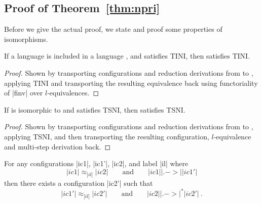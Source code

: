 \subsection{Proof of Theorem~\ref{thm:npri}}
\label{sec:proofs}

Before we give the actual proof, we state and proof some properties
of isomorphisms.

\begin{theorem}
  If a language  is included in a language , and 
  satisfies TINI, then  satisfies TINI.
\end{theorem}

\begin{proof}
  Shown by transporting configurations and reduction derivations
  from  to , applying TINI and transporting the resulting
  equivalence back using functoriality of |finv| over $l$-equivalences.
\end{proof}

\begin{theorem}
  If  is isomorphic to  and  satisfies TSNI, then
   satisfies TSNI.
\end{theorem}

\begin{proof}
  Shown by transporting configurations and reduction derivations from
   to , applying TSNI, and then transporting the
  resulting configuration, $l$-equivalence and multi-step derivation back.
\end{proof}


\begin{lemma}
  \label{lemma:tsni}
  For any configurations |ic1|, |ic1'|, |ic2|, and label |il| where
  \begin{equation} \label{eq:tsni-lemma-lhs}
  |ic1| \approx_{|il|} |ic2|
  \qquad \text{and} \qquad
  |ic1| |.->| |ic1'|
  \end{equation}
  then there exists a configuration |ic2'| such that
  \begin{equation} \label{eq:tsni-lemma-rhs}
  |ic1'| \approx_{|il|} |ic2'|
  \qquad \text{and} \qquad
  |ic2| |.->|^* |ic2'|
  \ \text{.}
  \end{equation}
\end{lemma}

